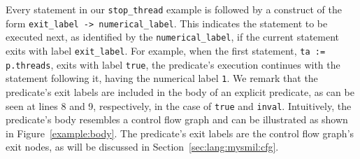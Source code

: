 \documentclass[11pt]{article}
\newcommand{\disp}[1]{\lstinline&#1&}
\begin{document}
Every statement in our \disp{stop_thread} example is followed by a construct of
the form \disp{exit_label -> numerical_label}. This indicates the statement to be
executed next, as identified by the \disp{numerical_label}, if the current 
statement exits with label \disp{exit_label}. For example, when the first 
statement, \disp{ta := p.threads}, exits with label \disp{true}, the predicate's 
execution continues with the statement following it, having the numerical label 
\disp{1}. %
We remark that the predicate's exit labels are included in the body of an 
explicit predicate, as can be seen at lines 8 and 9, respectively, in the case of 
\disp{true} and \disp{inval}. Intuitively, the predicate's body resembles a 
control flow graph and can be illustrated as shown in Figure~\ref{example:body}. 
The predicate's exit labels are the control flow graph's exit nodes, as will be 
discussed in Section~\ref{sec:lang:mysmil:cfg}.  

\end{document}
